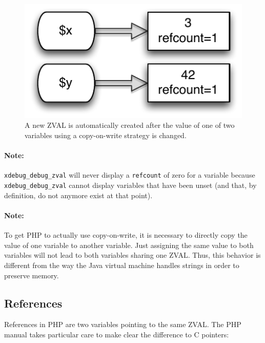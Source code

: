 \begin{figure}[htb]
  \begin{center}
    \includegraphics[scale=0.8]{images/x_3_y_42}
    \caption{A new ZVAL is automatically created after the value of one of two variables using a copy-on-write strategy is changed.}
    \label{fig:new-zval-after-copy-on-write}
  \end{center}
\end{figure}

\paragraph{Note:} \texttt{xdebug\_debug\_zval} will never display a \texttt{refcount} of zero for a variable because \texttt{xdebug\_debug\_zval} cannot display variables that have been unset (and that, by definition, do not anymore exist at that point).

\paragraph{Note:} To get PHP to actually use copy-on-write, it is necessary to directly copy the value of one variable to another variable. Just assigning the same value to both variables will not lead to both variables sharing one ZVAL. Thus, this behavior is different from the way the Java virtual machine handles strings in order to preserve memory.~\cite[chapter~2]{jvm-spec}


\subsection{References}
\label{sec:references}

References in PHP are two variables pointing to the same ZVAL. The PHP manual takes particular care to make clear the difference to C pointers:~\cite{php-manual-what-references-are}\cite{php-manual-what-references-are-not}

